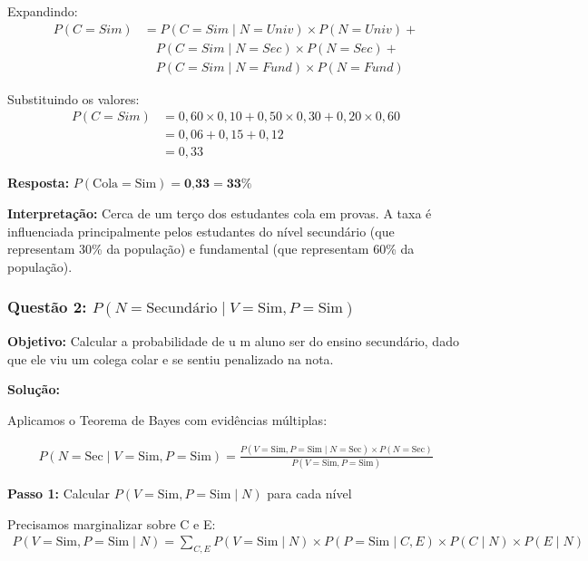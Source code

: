 \documentclass[a4paper,12pt]{article}
\begin{document}
Expandindo:
\begin{align}
P(C=Sim) &= P(C=Sim \mid N=Univ) \times P(N=Univ) + \nonumber \\
         &\quad P(C=Sim \mid N=Sec) \times P(N=Sec) + \nonumber \\
         &\quad P(C=Sim \mid N=Fund) \times P(N=Fund)
\end{align}

Substituindo os valores:
\begin{align}
P(C=Sim) &= 0,60 \times 0,10 + 0,50 \times 0,30 + 0,20 \times 0,60 \nonumber \\
         &= 0,06 + 0,15 + 0,12 \nonumber \\
         &= 0,33
\end{align}

\textbf{Resposta:} $P(\text{Cola}=\text{Sim}) = \textbf{0,33} = \textbf{33\%}$

\textbf{Interpretação:} Cerca de um terço dos estudantes cola em provas. A taxa é influenciada principalmente pelos estudantes do nível secundário (que representam 30\% da população) e fundamental (que representam 60\% da população).

\subsubsection{Questão 2: \texorpdfstring{$P(N=\text{Secundário} \mid V=\text{Sim}, P=\text{Sim})$}{P(N=Secundário | V=Sim, P=Sim)}}

\textbf{Objetivo:} Calcular a probabilidade de u  m aluno ser do ensino secundário, dado que ele viu um colega colar e se sentiu penalizado na nota.

\textbf{Solução:}

Aplicamos o Teorema de Bayes com evidências múltiplas:

\begin{align}
P(N=\text{Sec} \mid V=\text{Sim}, P=\text{Sim}) = \frac{P(V=\text{Sim}, P=\text{Sim} \mid N=\text{Sec}) \times P(N=\text{Sec})}{P(V=\text{Sim}, P=\text{Sim})}
\end{align}

\textbf{Passo 1:} Calcular $P(V=\text{Sim}, P=\text{Sim} \mid N)$ para cada nível

Precisamos marginalizar sobre C e E:
\begin{align}
P(V=\text{Sim}, P=\text{Sim} \mid N) = \sum_{C,E} P(V=\text{Sim} \mid N) \times P(P=\text{Sim} \mid C,E) \times P(C \mid N) \times P(E \mid N)
\end{align}
\end{document}
